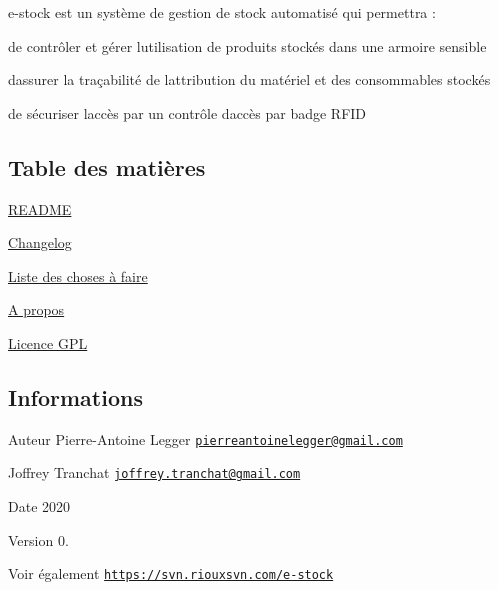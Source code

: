 e-\/stock est un système de gestion de stock automatisé qui permettra \+:


\begin{DoxyItemize}
\item de contrôler et gérer l\textquotesingle{}utilisation de produits stockés dans une armoire sensible
\item d\textquotesingle{}assurer la traçabilité de l\textquotesingle{}attribution du matériel et des consommables stockés
\item de sécuriser l\textquotesingle{}accès par un contrôle d\textquotesingle{}accès par badge R\+F\+ID
\end{DoxyItemize}\hypertarget{index_section_tdm}{}\subsection{Table des matières}\label{index_section_tdm}

\begin{DoxyItemize}
\item \hyperlink{page__r_e_a_d_m_e}{R\+E\+A\+D\+ME}
\item \hyperlink{page_changelog}{Changelog}
\item \hyperlink{todo}{Liste des choses à faire}
\item \hyperlink{page_about}{A propos}
\item \hyperlink{page_licence}{Licence G\+PL}
\end{DoxyItemize}\hypertarget{index_section_infos}{}\subsection{Informations}\label{index_section_infos}
\begin{DoxyAuthor}{Auteur}
Pierre-\/\+Antoine Legger \href{mailto:pierreantoinelegger@gmail.com}{\tt pierreantoinelegger@gmail.\+com} 

Joffrey Tranchat \href{mailto:joffrey.tranchat@gmail.com}{\tt joffrey.\+tranchat@gmail.\+com} 
\end{DoxyAuthor}
\begin{DoxyDate}{Date}
2020 
\end{DoxyDate}
\begin{DoxyVersion}{Version}
0. 
\end{DoxyVersion}
\begin{DoxySeeAlso}{Voir également}
\href{https://svn.riouxsvn.com/e-stock}{\tt https\+://svn.\+riouxsvn.\+com/e-\/stock} 
\end{DoxySeeAlso}
